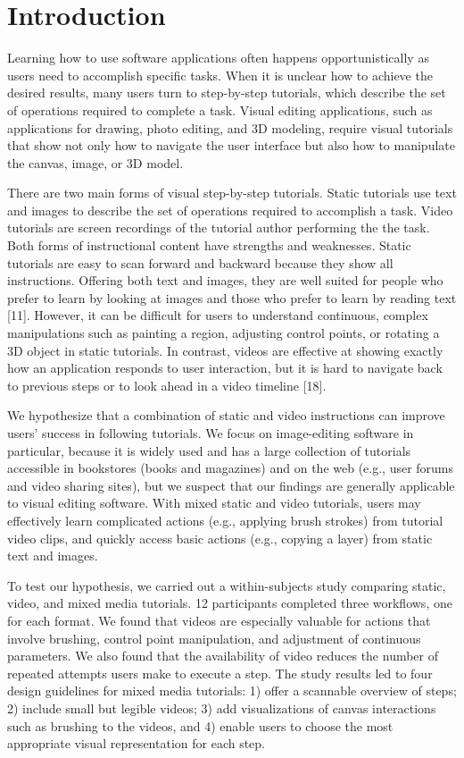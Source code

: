 \section{Introduction}

Learning how to use software applications often happens opportunistically as users need to accomplish specific tasks. When it is unclear how to achieve the desired results, many users turn to step-by-step tutorials, which describe the set of operations required to complete a task. Visual editing applications, such as applications for drawing, photo editing, and 3D modeling, require visual tutorials that show not only how to navigate the user interface but also how to manipulate the canvas, image, or 3D model.

There are two main forms of visual step-by-step tutorials. Static tutorials use text and images to describe the set of operations required to accomplish a task. Video tutorials are screen recordings of the tutorial author performing the the task. Both forms of instructional content have strengths and weaknesses. Static tutorials are easy to scan forward and backward because they show all instructions. Offering both text and images, they are well suited for people who prefer to learn by looking at images and those who prefer to learn by reading text [11]. However, it can be difficult for users to understand continuous, complex manipulations such as painting a region, adjusting control points, or rotating a 3D object in static tutorials. In contrast, videos are effective at showing exactly how an application responds to user interaction, but it is hard to navigate back to previous steps or to look ahead in a video timeline [18].

We hypothesize that a combination of static and video instructions can improve users’ success in following tutorials. We focus on image-editing software in particular, because it is widely used and has a large collection of tutorials accessible in bookstores (books and magazines) and on the web (e.g., user forums and video sharing sites), but we suspect that our findings are generally applicable to visual editing software. With mixed static and video tutorials, users may effectively learn complicated actions (e.g., applying brush strokes) from tutorial video clips, and quickly access basic actions (e.g., copying a layer) from static text and images.

To test our hypothesis, we carried out a within-subjects study comparing static, video, and mixed media tutorials. 12 participants completed three workflows, one for each format. We found that videos are especially valuable for actions that involve brushing, control point manipulation, and adjustment of continuous parameters. We also found that the availability of video reduces the number of repeated attempts users make to execute a step. The study results led to four design guidelines for mixed media tutorials: 1) offer a scannable overview of steps; 2) include small but legible videos; 3) add visualizations of canvas interactions such as brushing to the videos, and 4) enable users to choose the most appropriate visual representation for each step.

